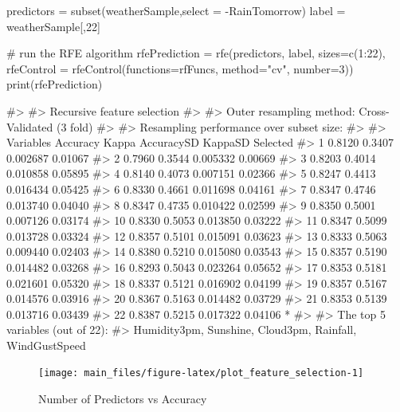 \begin{Schunk}
\begin{Sinput}
predictors = subset(weatherSample,select = -RainTomorrow)
label = weatherSample[,22]

# run the RFE algorithm
rfePrediction = rfe(predictors, label, sizes=c(1:22), 
                    rfeControl = rfeControl(functions=rfFuncs, method="cv", number=3))
print(rfePrediction)
\end{Sinput}
\begin{Soutput}
#> 
#> Recursive feature selection
#> 
#> Outer resampling method: Cross-Validated (3 fold) 
#> 
#> Resampling performance over subset size:
#> 
#>  Variables Accuracy  Kappa AccuracySD KappaSD Selected
#>          1   0.8120 0.3407   0.002687 0.01067         
#>          2   0.7960 0.3544   0.005332 0.00669         
#>          3   0.8203 0.4014   0.010858 0.05895         
#>          4   0.8140 0.4073   0.007151 0.02366         
#>          5   0.8247 0.4413   0.016434 0.05425         
#>          6   0.8330 0.4661   0.011698 0.04161         
#>          7   0.8347 0.4746   0.013740 0.04040         
#>          8   0.8347 0.4735   0.010422 0.02599         
#>          9   0.8350 0.5001   0.007126 0.03174         
#>         10   0.8330 0.5053   0.013850 0.03222         
#>         11   0.8347 0.5099   0.013728 0.03324         
#>         12   0.8357 0.5101   0.015091 0.03623         
#>         13   0.8333 0.5063   0.009440 0.02403         
#>         14   0.8380 0.5210   0.015080 0.03543         
#>         15   0.8357 0.5190   0.014482 0.03268         
#>         16   0.8293 0.5043   0.023264 0.05652         
#>         17   0.8353 0.5181   0.021601 0.05320         
#>         18   0.8337 0.5121   0.016902 0.04199         
#>         19   0.8357 0.5167   0.014576 0.03916         
#>         20   0.8367 0.5163   0.014482 0.03729         
#>         21   0.8353 0.5139   0.013716 0.03439         
#>         22   0.8387 0.5215   0.017322 0.04106        *
#> 
#> The top 5 variables (out of 22):
#>    Humidity3pm, Sunshine, Cloud3pm, Rainfall, WindGustSpeed
\end{Soutput}
\end{Schunk}

\begin{Schunk}
\begin{figure}[H]

{\centering \texttt{[image: main\_files/figure-latex/plot\_feature\_selection-1]} 

}

\caption[Number of Predictors vs Accuracy]{Number of Predictors vs Accuracy}\label{fig:plot_feature_selection}
\end{figure}
\end{Schunk}

